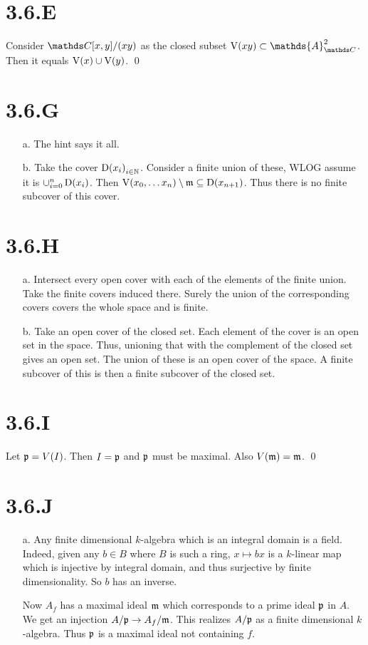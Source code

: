 \documentclass{article}
\begin{document}
\section{3.6.E}
Consider $\C[x,y]/(xy)$ as the closed subset $\V(xy) \subset \mathds{A}^2_{\C}$. Then it equals $\operatorname{V}(x) \cup \operatorname{V}(y)$. \qed

\section{3.6.G}
\begin{itemize}
    \item[a.] The hint says it all.
    \item[b.] Take the cover ${\operatorname{D}(x_i)}_{i \in \mathbb{N}}$. Consider a finite union of these, WLOG assume it is $\cup_{i=0}^n \operatorname{D}(x_i)$. Then $\operatorname{V}(x_0, \dots x_n) \setminus \mathfrak{m} \subseteq \operatorname{D}(x_{n+1})$. Thus there is no finite subcover of this cover.
\end{itemize}

\section{3.6.H}
\begin{itemize}
    \item [a.] Intersect every open cover with each of the elements of the finite union. Take the finite covers induced there. Surely the union of the corresponding covers covers the whole space and is finite.
    \item [b.] Take an open cover of the closed set. Each element of the cover is an open set in the space. Thus, unioning that with the complement of the closed set gives an open set. The union of these is an open cover of the space. A finite subcover of this is then a finite subcover of the closed set.
\end{itemize}

\section{3.6.I}
Let ${\mathfrak{p}}=V(I)$. Then $I=\mathfrak{p}$ and $\mathfrak{p}$ must be maximal. Also $V(\mathfrak{m})={\mathfrak{m}}$. \qed

\section{3.6.J}
\begin{itemize}
    \item [a.]
          Any finite dimensional $k$-algebra which is an integral domain is a field. Indeed, given any $b \in B$ where $B$ is such a ring, $x \mapsto bx$ is a $k$-linear map which is injective by integral domain, and thus surjective by finite dimensionality. So $b$ has an inverse.

          Now $A_f$ has a maximal ideal $\mathfrak{m}$ which corresponds to a prime ideal $\mathfrak{p}$ in $A$. We get an injection $A/\mathfrak{p} \to A_f/\mathfrak{m}$. This realizes $A/\mathfrak{p}$ as a finite dimensional $k$-algebra. Thus $\mathfrak{p}$ is a maximal ideal not containing $f$.
\end{itemize}
\end{document}
